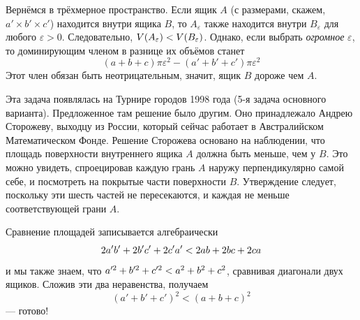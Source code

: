 Вернёмся в трёхмерное пространство.
Если ящик $A$ (с размерами, скажем, $a'\times b'\times c'$) находится внутри ящика $B$, то $A_\varepsilon$ также находится внутри $B_\varepsilon$ для любого $\varepsilon > 0$.
Следовательно, $V(A_\varepsilon ) \z< V(B_\varepsilon)$.
Однако, если выбрать \emph{огромное} $\varepsilon$, то доминирующим членом в разнице их объёмов станет
\[(a+b+c)\pi\varepsilon^2-(a'+b'+c')\pi\varepsilon^2\]
Этот член обязан быть неотрицательным, значит, ящик $B$ дороже чем $A$.

Эта задача появлялась на Турнире городов 1998 года (5-я задача основного варианта).
Предложенное там решение было другим.
Оно принадлежало Андрею Сторожеву, выходцу из России, который сейчас работает в Австралийском Математическом Фонде.
Решение Сторожева основано на наблюдении, что площадь поверхности внутреннего ящика $A$ должна быть меньше, чем у  $B$.
Это можно увидеть, спроецировав каждую грань $A$ наружу перпендикулярно самой себе, 
и посмотреть на покрытые части поверхности $B$.
Утверждение следует, поскольку эти шесть частей не пересекаются, и каждая не меньше соответствующей грани $A$.

Сравнение площадей записывается алгебраически 
\[2a'b'\z+2b'c'\z+2c'a' \z< 2ab\z+2bc\z+2ca\] 
и мы также знаем, что $a'^2\z+b'^2\z+c'^2\z<a^2\z+b^2\z+c^2$, сравнивая диагонали двух ящиков.
Сложив эти два неравенства, получаем 
\[(a'+b'+c')^2<(a+b+c)^2\]
--- готово!

